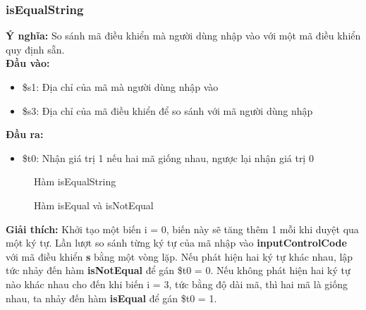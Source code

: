 \documentclass[a4paper,12pt]{article}
\begin{document}
	\subsubsection{isEqualString}
	    \textbf{Ý nghĩa:} So sánh mã điều khiển mà người dùng nhập vào với một mã điều khiển quy định sẵn.\\
	    \textbf{Đầu vào:} 
	    \begin{itemize}
            \item \$s1: Địa chỉ của mã mà người dùng nhập vào
            \item \$s3: Địa chỉ của mã điều khiển để so sánh với mã người dùng nhập
        \end{itemize}
        \textbf{Đầu ra:}
        \begin{itemize}
            \item \$t0: Nhận giá trị 1 nếu hai mã giống nhau, ngược lại nhận giá trị 0        
        \end{itemize}
        \FloatBarrier
        \begin{figure}[ht!]
    	    \centerline{}
    	    \caption{Hàm isEqualString}
    	    \label{fig:bai100}
        \end{figure}
        \FloatBarrier
        \begin{figure}[ht!]
    	    \centerline{}
    	    \caption{Hàm isEqual và isNotEqual}
    	    \label{fig:bai100}
        \end{figure}
        \noindent
	    \textbf{Giải thích:} Khởi tạo một biến i = 0, biến này sẽ tăng thêm 1 mỗi khi duyệt qua một ký tự. Lần lượt so sánh từng ký tự của mã nhập vào \textbf{inputControlCode} với mã điều khiển \textbf{s} bằng một vòng lặp. Nếu phát hiện hai ký tự khác nhau, lập tức nhảy đến hàm \textbf{isNotEqual} để gán \$t0 = 0. Nếu không phát hiện hai ký tự nào khác nhau cho đến khi biến i = 3, tức bằng độ dài mã, thì hai mã là giống nhau, ta nhảy đến hàm \textbf{isEqual} để gán \$t0 = 1. 
\end{document}
